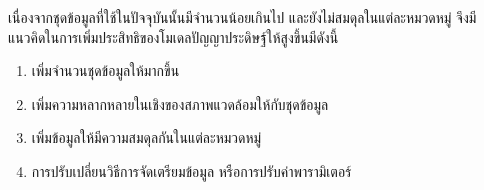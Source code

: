 เนื่องจากชุดข้อมูลที่ใช้ในปัจจุบันนั้นมีจำนวนน้อยเกินไป และยังไม่สมดุลในแต่ละหมวดหมู่ จึงมีแนวคิดในการเพิ่มประสิทธิของโมเดลปัญญาประดิษฐ์ให้สูงขึ้นมีดังนี้
\begin{enumerate}
	\item เพิ่มจำนวนชุดข้อมูลให้มากขึ้น
	\item เพิ่มความหลากหลายในเชิงของสภาพแวดล้อมให้กับชุดข้อมูล
	\item เพิ่มข้อมูลให้มีความสมดุลกันในแต่ละหมวดหมู่
	\item การปรับเปลี่ยนวิธีการจัดเตรียมข้อมูล หรือการปรับค่าพารามิเตอร์
\end{enumerate}